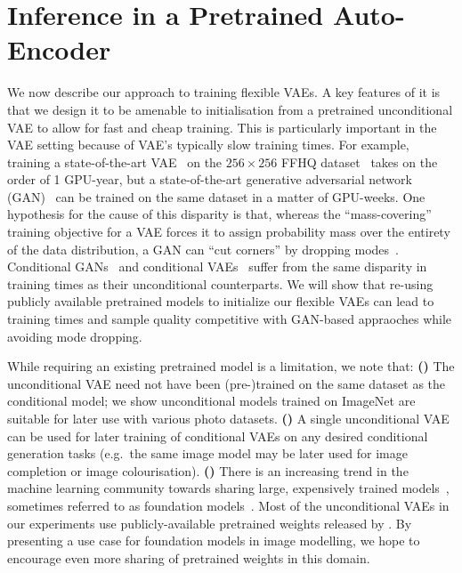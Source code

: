 \section{Inference in a Pretrained Auto-Encoder}
\label{sec:ipa}

We now describe our approach to training flexible VAEs. A key features of it is that we design it to be amenable to initialisation from a pretrained unconditional VAE to allow for fast and cheap training.  This is particularly important in the VAE setting because of VAE's typically slow training times. For example,
training a state-of-the-art VAE~\citep{vahdat2020nvae,child2020very} on the
$256\times256$ FFHQ dataset~\citep{karras2019style} takes on the order of 1
GPU-year, but a state-of-the-art generative adversarial network
(GAN)~\citep{lin2021anycost,karras2020analyzing} can be trained on the same
dataset in a matter of GPU-weeks. One hypothesis for the cause of this disparity
is that, whereas the ``mass-covering'' training objective for a VAE forces it to
assign probability mass over the entirety of the data distribution, a GAN can
``cut corners'' by dropping modes~\citep{arora2017gans,arora2017generalization}. Conditional GANs~\citep{zheng2019pluralistic,zhao2021large} and conditional VAEs~\citep{sohn2015learning,ivanov2018variational} suffer from the same disparity in training times as their unconditional counterparts. We will show that re-using publicly available pretrained models to initialize our flexible VAEs can lead to training times and sample quality competitive with GAN-based appraoches while avoiding mode dropping.



While requiring an existing pretrained model is a limitation, we note that:
\textbf{()} The unconditional VAE need not have been (pre-)trained on the same dataset as the conditional model; we show unconditional models trained on
ImageNet are suitable for later use with various photo datasets.
\textbf{()} A single unconditional VAE can be used for later training of
conditional VAEs on any desired conditional generation tasks (e.g.~the same
image model may be later used for image completion or image colourisation).
\textbf{()} There is an increasing trend in the machine learning community towards
sharing large, expensively trained models~\citep{wolf2020transformers},
sometimes referred to as foundation models~\citep{bommasani2021opportunities}.
Most of the unconditional VAEs in our experiments use publicly-available
pretrained weights released by \citet{child2020very}. By presenting a use case
for foundation models in image modelling, we hope to encourage even more sharing
of pretrained weights in this domain.

